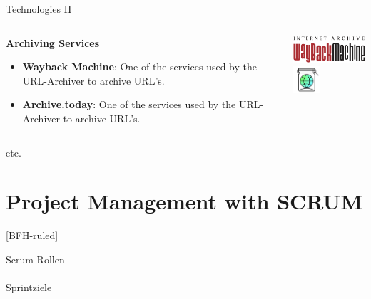 \documentclass[
    ngerman,%
    authorontitle=true,
]{bfhbeamer}
\begin{document}
    \begin{frame}{Technologies II}
        \begin{columns}
            \begin{column}{0.7\textwidth}
                \textbf{Archiving Services}
                \begin{itemize}
                    \item \textbf{Wayback Machine}: One of the services used by the URL-Archiver to archive URL's.
                    \item \textbf{Archive.today}: One of the services used by the URL-Archiver to archive URL's.
                \end{itemize}
            \end{column}
            \begin{column}{0.3\textwidth}
                \includegraphics[height=1cm]{pictures/Wayback_Machine_logo}
                \vspace{1em}
                \includegraphics[height=1cm]{pictures/archive_today_logo}
            \end{column}
        \end{columns}
    \end{frame}

    \begin{frame}{etc.}
        \framesubtitle{}
    \end{frame}



    \section{Project Management with SCRUM}
    [BFH-ruled]
    \frame{\sectionpage}

    \begin{frame}{Scrum-Rollen}
        \framesubtitle{}
    \end{frame}

    \begin{frame}{Sprintziele}
        \framesubtitle{}
    \end{frame}
\end{document}
